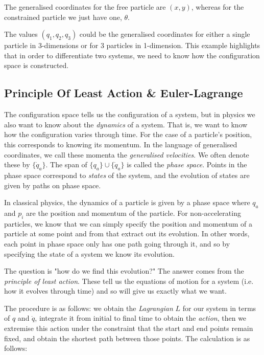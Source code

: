 \bex 
    The generalised coordinates for the free particle are $(x,y)$, whereas for the constrained particle we just have one, $\theta$.
\eex 

\bex 
    The values $(q_1,q_2,q_3)$ could be the generalised coordinates for either a single particle in 3-dimensions or for 3 particles in 1-dimension. This example highlights that in order to differentiate two systems, we need to know how the configuration space is constructed.
\eex 

\subsection{Principle Of Least Action \& Euler-Lagrange}

The configuration space tells us the configuration of a system, but in physics we also want to know about the \textit{dynamics} of a system. That is, we want to know how the configuration varies through time. For the case of a particle's position, this corresponds to knowing its momentum. In the language of generalised coordinates, we call these momenta the \textit{generalised velocities}. We often denote these by $\{\dot{q}_a\}$. The span of $\{q_a\}\cup\{\dot{q}_a\}$ is called the \textit{phase space}. Points in the phase space correspond to \textit{states} of the system, and the evolution of states are given by paths on phase space.

In classical physics, the dynamics of a particle is given by a phase space where $q_a$ and $p_i$ are the position and momentum of the particle. For non-accelerating particles, we know that we can simply specify the position and momentum of a particle at some point and from that extract out its evolution. In other words, each point in phase space only has one path going through it, and so by specifying the state of a system we know its evolution. 

The question is "how do we find this evolution?" The answer comes from the \textit{principle of least action}. These tell us the equations of motion for a system (i.e. how it evolves through time) and so will give us exactly what we want.

The procedure is as follows: we obtain the \textit{Lagrangian} $L$ for our system in terms of $q$ and $\dot{q}$, integrate it from initial to final time to obtain the \textit{action}, then we extremise this action under the constraint that the start and end points remain fixed, and obtain the shortest path between those points. The calculation is as follows: 

